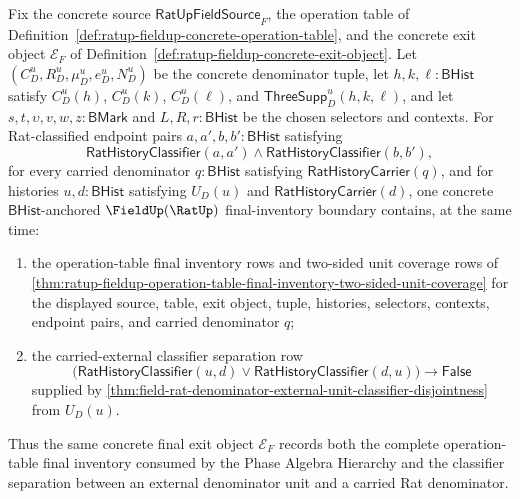 \begin{theorem}
\label{thm:ratup-fieldup-final-inventory-carried-external-unit-separation}
Fix the concrete source $\mathsf{RatUpFieldSource}_F$, the operation table of
Definition~\ref{def:ratup-fieldup-concrete-operation-table}, and the concrete
exit object $\mathcal E_F$ of
Definition~\ref{def:ratup-fieldup-concrete-exit-object}. Let
$(C_D^u,R_D^u,\mu_D^u,e_D^u,N_D^u)$ be the concrete denominator tuple, let
$h,k,\ell:\mathsf{BHist}$ satisfy $C_D^u(h)$, $C_D^u(k)$, $C_D^u(\ell)$, and
$\mathsf{ThreeSupp}_D^u(h,k,\ell)$, and let
$s,t,\upsilon,v,w,z:\mathsf{BMark}$ and $L,R,r:\mathsf{BHist}$ be the chosen
selectors and contexts. For Rat-classified endpoint pairs
$a,a',b,b':\mathsf{BHist}$ satisfying
$$
\mathsf{RatHistoryClassifier}(a,a')
\land
\mathsf{RatHistoryClassifier}(b,b'),
$$
for every carried denominator $q:\mathsf{BHist}$ satisfying
$\mathsf{RatHistoryCarrier}(q)$, and for histories
$u,d:\mathsf{BHist}$ satisfying $U_D(u)$ and
$\mathsf{RatHistoryCarrier}(d)$, one concrete $\mathsf{BHist}$-anchored
$\FieldUp(\RatUp)$ final-inventory boundary contains, at the same time:
\begin{enumerate}
  \item the operation-table final inventory rows and two-sided unit coverage
  rows of
  \autoref{thm:ratup-fieldup-operation-table-final-inventory-two-sided-unit-coverage}
  for the displayed source, table, exit object, tuple, histories, selectors,
  contexts, endpoint pairs, and carried denominator $q$;
  \item the carried-external classifier separation row
  $$
  \bigl(
  \mathsf{RatHistoryClassifier}(u,d)\lor
  \mathsf{RatHistoryClassifier}(d,u)
  \bigr)\to\mathsf{False}
  $$
  supplied by
  \autoref{thm:field-rat-denominator-external-unit-classifier-disjointness}
  from $U_D(u)$.
\end{enumerate}
Thus the same concrete final exit object $\mathcal E_F$ records both the
complete operation-table final inventory consumed by the Phase Algebra
Hierarchy and the classifier separation between an external denominator unit
and a carried Rat denominator.
\end{theorem}
